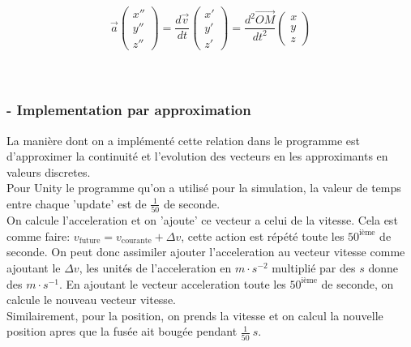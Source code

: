 \documentclass[a4paper, 12pt]{scrartcl}
\begin{document}
\[\overrightarrow{a} \begin{pmatrix} x'' \\ y'' \\ z'' \end{pmatrix}
= \frac{d\overrightarrow{v}}{d t} \begin{pmatrix} x' \\ y' \\ z' \end{pmatrix}
= \frac{d^2 \overrightarrow{OM}}{d t^2}\begin{pmatrix} x \\ y \\ z \end{pmatrix}\]
\\
\\
\subsubsection{- Implementation par approximation}
La manière dont on a implémenté cette relation dans le programme est d'approximer la 
continuité et l'evolution des vecteurs en les approximants en valeurs discretes. 
\\
Pour Unity le programme qu'on a utilisé pour la simulation, la valeur de temps entre chaque 'update' est de $\frac{1}{50}$ de seconde. 
\\
On calcule l'acceleration et on 'ajoute' ce vecteur a celui de la vitesse. Cela est comme faire: $v_{\text{future}} = v_{\text{courante}} + \Delta v$, cette action est répété
toute les $50^{\text{ième}}$ de seconde. On peut donc assimiler ajouter l'acceleration au vecteur vitesse comme ajoutant le $\Delta v$, 
les unités de l'acceleration en $m \cdot s^{-2}$ multiplié par des $s$ donne des $m \cdot s^{-1}$. En ajoutant le vecteur acceleration toute les $50^{\text{ième}}$ de seconde, 
on calcule le nouveau vecteur vitesse. 
\\
Similairement, pour la position, on prends la vitesse et on calcul la nouvelle position apres que la fusée
ait bougée pendant $\frac{1}{50}\ s$.
\end{document}
